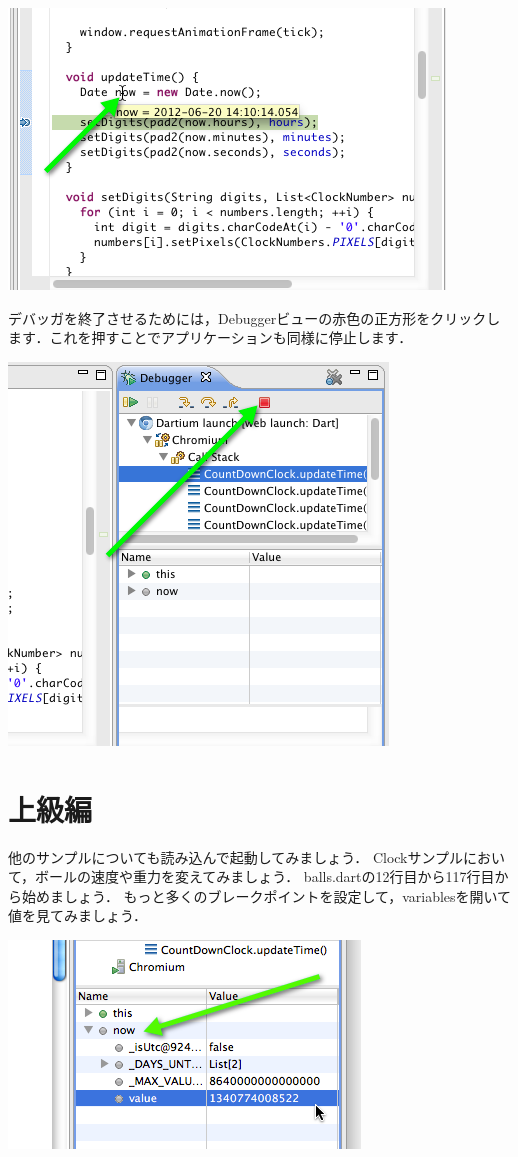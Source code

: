 \includegraphics{step1/debug_img3.png}

デバッガを終了させるためには，Debuggerビューの赤色の正方形をクリックします．これを押すことでアプリケーションも同様に停止します．

\includegraphics{step1/debug_img4.png}

\section{上級編}

他のサンプルについても読み込んで起動してみましょう．
Clockサンプルにおいて，ボールの速度や重力を変えてみましょう．
balls.dartの12行目から117行目から始めましょう．
もっと多くのブレークポイントを設定して，variablesを開いて値を見てみましょう．

\includegraphics{step1/advanced.png}

\clearpage
